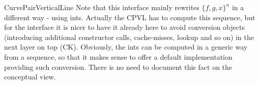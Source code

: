 \begin{ccRefConcept}{CurvePairVerticalLine}
Note that this interface mainly rewrites $\{f,g,x\}^n$ in a different way - 
using ints. Actually the CPVL has to compute this sequence, but for
the interface it is nicer to have it already here to avoid conversion objects
(introducing additional constructor calls, cache-misses, lookup and so on) in
the next layer on top (CK). Obviously, the ints can be computed in a generic
way from a sequence, so that it makes sense to offer a default implementation
providing such conversion. There is no need to document this fact on the 
conceptual view.


\end{ccRefConcept}

